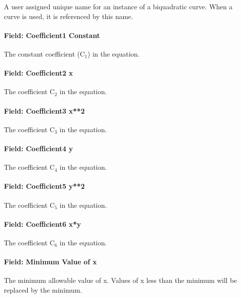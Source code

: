 A user assigned unique name for an instance of a biquadratic curve. When a curve is used, it is referenced by this name.

\paragraph{Field: Coefficient1 Constant}\label{field-coefficient1-constant-7}

The constant coefficient (C\(_{1}\)) in the equation.

\paragraph{Field: Coefficient2 x}\label{field-coefficient2-x-5}

The coefficient C\(_{2}\) in the equation.

\paragraph{Field: Coefficient3 x**2}\label{field-coefficient3-x2-4}

The coefficient C\(_{3}\) in the equation.

\paragraph{Field: Coefficient4 y}\label{field-coefficient4-y-2}

The coefficient C\(_{4}\) in the equation.

\paragraph{Field: Coefficient5 y**2}\label{field-coefficient5-y2-1}

The coefficient C\(_{5}\) in the equation.

\paragraph{Field: Coefficient6 x*y}\label{field-coefficient6-xy-1}

The coefficient C\(_{6}\) in the equation.

\paragraph{Field: Minimum Value of x}\label{field-minimum-value-of-x-7}

The minimum allowable value of x. Values of x less than the minimum will be replaced by the minimum.

